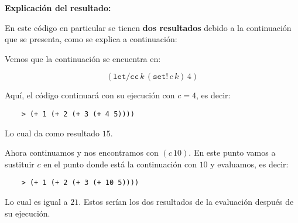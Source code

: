 \textbf{Explicación del resultado:}

En este código en particular se tienen \textbf{dos resultados} debido a la continuación que se presenta, como se explica a continuación: 

Vemos que la continuación se encuentra en:

\[
(\texttt{let/cc} \, k \, (\texttt{set!} \, c \, k) \, 4)
\]

Aquí, el código continuará con su ejecución con \(c = 4\), es decir:

\begin{verbatim}
    > (+ 1 (+ 2 (+ 3 (+ 4 5))))
\end{verbatim}

Lo cual da como resultado \(15\).

Ahora continuamos y nos encontramos con \((c \, 10)\). En este punto vamos a sustituir \(c\) en el punto donde está la continuación con \(10\) y evaluamos, es decir:

\begin{verbatim}
    > (+ 1 (+ 2 (+ 3 (+ 10 5))))
\end{verbatim}

Lo cual es igual a \(21\). Estos serían los dos resultados de la evaluación después de su ejecución.